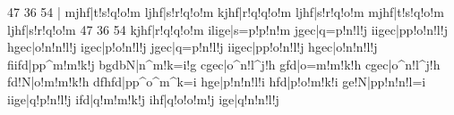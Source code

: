 \def\Tbutr#1#2#3{\Dbutr{#1}{#2}{#3}\butr{#1}{#2}{#3}}%
%
\def\tbud#1#2{\dbud{#1}{#2}\bud{#1}{#2}}%
\def\Tbud#1#2{\Dbud{#1}{#2}\bud{#1}{#2}}%
%
\def\register#1{\boxit{\hbox{\bf #1}}}
%
%
%
\ifnum{}\def\bottomfacteur{7}\else\def\bottomfacteur{5}\fi
\debutmorceau
%
\ifnum{}\relax
  47\else
  36\fi
\ifx\undefined\horizontalscore \else{}54\fi
%
\bigaccid
{}\relax
\notes\zmidtwotext{\fff}|\enotes 
% 
% 
\tnotes\lmotbba mjhf|\umotif t!s!q!o!m\enotes
\tnotes\tbuq ljhf|\umotif s!r!q!o!m\enotes
\zbnotes\tbuqr kjhf|\umotif r!q!q!o!m\enotes
\tnotes\tbuq ljhf|\umotif s!r!q!o!m\enotes
\bnotes\lmotbba mjhf|\umotif t!s!q!o!m\enotes
\tnotes\tbuq ljhf|\umotif s!r!q!o!m\enotes
\ifnum{}\relax
  47\else
  36\fi
\ifx\undefined\horizontalscore \else{}54\fi
\zbnotes\tbuqr kjhf|\umotif r!q!q!o!m\enotes
\tnotes\na i\tbuq lige|\umotif s=p!p!n!m\enotes
\bnotes\lmotbba jgec|\umotif q=p!n!l!j\enotes
\nspace\tnotes\na i\tbuq igec|\na p\umotif p!o!n!l!j\enotes
\zbnotes\tbuqr hgec|\umotif o!n!n!l!j\enotes
\tnotes\tbuq igec|\umotif p!o!n!l!j\enotes
\bnotes\lmotbba jgec|\umotif q=p!n!l!j\enotes
\nspace\tnotes\na i\tbuq igec|\na p\umotif p!o!n!l!j\enotes
\zbnotes\tbuqr hgec|\umotif o!n!n!l!j\enotes
\tnotes\sh f\na i\tbut ifd|\na p\umotif p^m!m!k!j\enotes
\bnotes\na b\lmotbbc gdbN|\umotif n^m!k=i!g\enotes
\nspace\tnotes\sh c\tbut gec|\umotif o^n!l^j!h\enotes
\zbnotes\tbutr gfd|\umotif o=m!m!k!h\enotes
\tnotes\sh c\tbut gec|\umotif o^n!l^j!h\enotes
\bnotes\lmotbbb fd!N|\umotif o!m!m!k!h\enotes
\qspace
\tnotes\lsh d\sh f\tbut hfd|\na p\umotif p^o^m^k=i\enotes
\zbnotes\tbutr hge|\umotif p!n!n!l!i\enotes
\tnotes\tbut hfd|\umotif p!o!m!k!i\enotes
\bnotes\lmotbbb ge!N|\na p\umotif p!n!n!l=i\enotes
\nspace\tnotes\fl i\tbut ige|\umotif q!p!n!l!j\enotes
\zbnotes\tbut ifd|\umotif q!m!m!k!j\enotes
\tnotes\tbutr ihf|\umotif q!o!o!m!j\enotes
\def\manuale{}%
\def\pedalepause{}%
\def\atnextline{\nbporteesii=2\relax
    \nbporteesi=1\relax
    \def\nbinstruments{2}\relax
    \global\cleftoksii={{0}{0}{0}{0}}\global\cleftoksi={{6}{0}{0}{0}}\relax
    \def\pedalepause{\Pause}\def\manuale{&}\relax
    \signaturegenerale{-1}}\relax
%    
\bnotes\pedalepause\manuale\tbut ige|\umotif q!n!n!l!j\enotes
